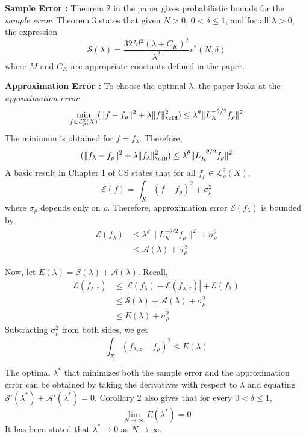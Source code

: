 \begin{itemize}
\noindent \textbf{Sample Error :}
Theorem 2 in the paper gives probabilistic bounds for the \textit{sample error}.
Theorem 3 states that given $N>0$, $0<\delta \leq 1$, and for all $\lambda>0$, the expression 
\[
\mathcal{S}(\lambda) = \frac{32 M^2 (\lambda + C_K)^2}{\lambda^2} v^*(N,\delta)
\]
where $M$ and $C_K$ are appropriate constants defined in the paper. 

\noindent \textbf{Approximation Error :} To choose the optimal $\lambda$, the paper looks at the \textit{approximation error}. 
\[
\min_{f \in \mathcal{L}_\rho^2(X)} (\|f - f_\rho\|^2 + \lambda \|f\|^2_\clH) \leq \lambda^\theta \|L_K^{-\theta/2} f_\rho \|^2
\]
The minimum is obtained for $f = f_\lambda$. Therefore,
\[
(\|f_\lambda - f_\rho\|^2 + \lambda \|f_\lambda\|^2_\clH) \leq \lambda^\theta \|L_K^{-\theta/2} f_\rho \|^2
\]
A basic result in Chapter 1 of CS states that for all $f_\rho \in \mathcal{L}_\rho^2(X)$, 
\[
\mathcal{E}(f) = \int_X (f - f_\rho)^2 + \sigma_\rho^2
\]
where $\sigma_\rho$ depends only on $\rho$. Therefore, approximation error $\mathcal{E}(f_\lambda)$ is bounded by,
\[
\begin{aligned}
\mathcal{E}(f_\lambda)  & \leq \lambda^\theta \|L_K^{-\theta/2} f_\rho \|^2 + \sigma_\rho^2\\
& \leq \mathcal{A}(\lambda) + \sigma_\rho^2 
\end{aligned}
\]

Now, let $E(\lambda) = \mathcal{S}(\lambda) + \mathcal{A}(\lambda)$. 
Recall,
\[
\begin{aligned}
\mathcal{E}(f_{\lambda,z}) &\leq |\mathcal{E}(f_\lambda) - \mathcal{E}(f_{\lambda,z})| + \mathcal{E}(f_\lambda) \\
& \leq \mathcal{S}(\lambda) + \mathcal{A}(\lambda) + \sigma_\rho^2\\
& \leq E(\lambda) + \sigma_\rho^2
\end{aligned}
\]
Subtracting $\sigma_\rho^2$ from both sides, we get
\[
\int_X (f_{\lambda,z} - f_\rho)^2 \leq E(\lambda)
\]

The optimal $\lambda^*$ that minimizes both the sample error and the approximation error can be obtained by taking the derivatives with respect to $\lambda$ and equating $\mathcal{S}'(\lambda^*) + \mathcal{A}'(\lambda^*) =0$. Corollary 2 also gives that for every $0 <\delta \leq 1$, 
\[
\lim_{N \to \infty} E(\lambda^*) = 0 
\]
It has been stated that $\lambda^* \to 0$ as $N \to \infty$.


\end{itemize}
